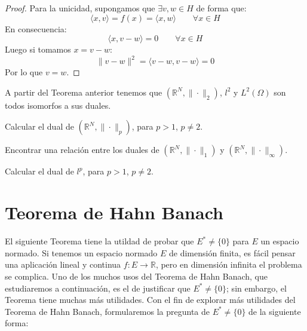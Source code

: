\begin{teo}
\begin{proof}
        \noindent
        Para la unicidad, supongamos que $\exists v,w\in H$ de forma que:
        \begin{equation*}
            \langle x,v \rangle  = f(x) = \langle x,w \rangle  \qquad \forall x\in H
        \end{equation*}
        En consecuencia:
        \begin{equation*}
            \langle x,v-w \rangle  = 0 \qquad \forall x\in H
        \end{equation*}
        Luego si tomamos $x=v-w$:
        \begin{equation*}
            \|v-w\|^2 = \langle v-w,v-w \rangle  = 0
        \end{equation*}
        Por lo que $v=w$.
    \end{proof}
\end{teo}

\noindent
A partir del Teorema anterior tenemos que $(\mathbb{R}^N, \|\cdot \|_2)$, $l^2$ y $L^2(\Omega)$ son todos isomorfos a sus duales.

\begin{ejercicio} %
    Calcular el dual de $(\mathbb{R}^N, \|\cdot \|_p)$, para $p>1$, $p\neq 2$.
\end{ejercicio}

\begin{ejercicio} %
    Encontrar una relación entre los duales de $(\mathbb{R}^N, \|\cdot \|_1)$ y $(\mathbb{R}^N, \|\cdot \|_\infty)$.
\end{ejercicio}

\begin{ejercicio} %
    Calcular el dual de $l^p$, para $p>1$, $p\neq 2$.
\end{ejercicio}

\section{Teorema de Hahn Banach}
\noindent
El siguiente Teorema tiene la utildad de probar que $E^\ast \neq \{0\}$ para $E$ un espacio normado. Si tenemos un espacio normado $E$ de dimensión finita, es fácil pensar una aplicación lineal y continua $f:E\to \mathbb{R}$, pero en dimensión infinita el problema se complica. Uno de los muchos usos del Teorema de Hahn Banach, que estudiaremos a continuación, es el de justificar que $E^\ast\neq \{0\}$; sin embargo, el Teorema tiene muchas más utilidades. Con el fin de explorar más utilidades del Teorema de Hahn Banach, formularemos la pregunta de $E^\ast\neq \{0\}$ de la siguiente forma:
\\

